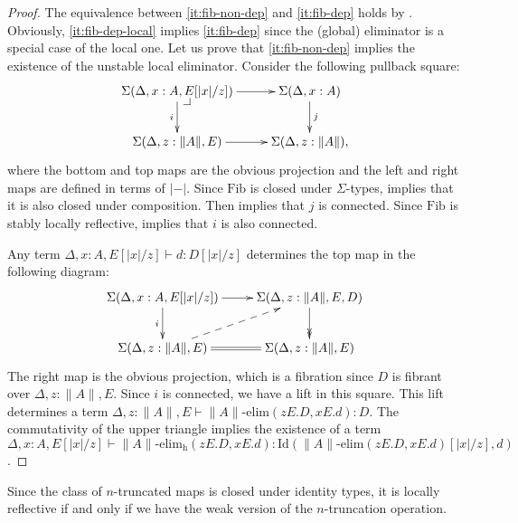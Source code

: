 \documentclass[reqno]{amsart}
\makeatletter
\theoremstyle{definition}
\theoremstyle{remark}
\newcommand{\fs}[1]{\mathrm{#1}}
\newcommand{\Id}{\fs{Id}}
\newcommand{\Fib}{\fs{Fib}}
\numberwithin{figure}{section}
\newcommand{\pb}[1][dr]{\save*!/#1-1.2pc/#1:(-1,1)@^{|-}\restore}
\makeatother
\begin{document}
\begin{proof}
The equivalence between \eqref{it:fib-non-dep} and \eqref{it:fib-dep} holds by .
Obviously, \eqref{it:fib-dep-local} implies \eqref{it:fib-dep} since the (global) eliminator is a special case of the local one.
Let us prove that \eqref{it:fib-non-dep} implies the existence of the unstable local eliminator.
Consider the following pullback square:
\[ \xymatrix{ \Sigma(\Delta, x : A, E[|x|/z]) \ar[r] \ar[d]_i \pb   & \Sigma(\Delta, x : A) \ar[d]^j \\
              \Sigma(\Delta, z : \| A \|, E) \ar[r]                 & \Sigma(\Delta, z : \| A \|),
            } \]
where the bottom and top maps are the obvious projection and the left and right maps are defined in terms of $| - |$.
Since $\Fib$ is closed under $\Sigma$-types,  implies that it is also closed under composition.
Then  implies that $j$ is connected.
Since $\Fib$ is stably locally reflective,  implies that $i$ is also connected.

Any term $\Delta, x : A, E[|x|/z] \vdash d : D[|x|/z]$ determines the top map in the following diagram:
\[ \xymatrix{ \Sigma(\Delta, x : A, E[|x|/z]) \ar[r] \ar[d]_i           & \Sigma(\Delta, z : \| A \|, E, D) \ar@{->>}[d] \\
              \Sigma(\Delta, z : \| A \|, E) \ar@{-->}[ur] \ar@{=}[r]   & \Sigma(\Delta, z : \| A \|, E)
            } \]
The right map is the obvious projection, which is a fibration since $D$ is fibrant over $\Delta, z : \| A \|, E$.
Since $i$ is connected, we have a lift in this square.
This lift determines a term $\Delta, z : \| A \|, E \vdash \| A \|\text{-}\fs{elim}(z E. D, x E. d) : D$.
The commutativity of the upper triangle implies the existence of a term $\Delta, x : A, E[|x|/z] \vdash \| A \|\text{-}\fs{elim_h}(z E. D, x E .d) : \Id(\| A \|\text{-}\fs{elim}(z E. D, x E. d)[|x|/z],d)$.
\end{proof}

\begin{example}
Since the class of $n$-truncated maps is closed under identity types, it is locally reflective if and only if we have the weak version of the $n$-truncation operation.
\end{example}



\end{document}
